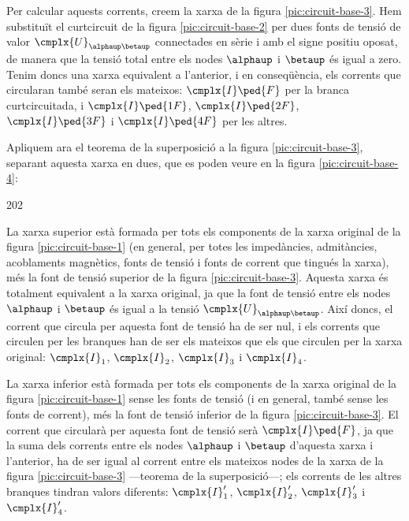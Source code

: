 \begin{center}
	
	\label{pic:circuit-base-2}
\end{center}


Per  calcular aquests corrents, creem  la xarxa de la figura  \vref{pic:circuit-base-3}. Hem substituït el curtcircuit de la  figura \vref{pic:circuit-base-2} per dues fonts de tensió de valor $\cmplx{U}_{\alphaup\betaup}$ connectades en sèrie i amb el signe positiu oposat, de manera que la tensió total entre els nodes $\alphaup$ i $\betaup$ és igual a zero. Tenim doncs una xarxa equivalent a l'anterior, i en conseqüència, els corrents que circularan també seran els mateixos: $\cmplx{I}\ped{F}$ per la branca curtcircuitada, i  $\cmplx{I}\ped{1F}$, $\cmplx{I}\ped{2F}$, $\cmplx{I}\ped{3F}$ i $\cmplx{I}\ped{4F}$ per les altres.

\begin{center}
	
	\label{pic:circuit-base-3}
\end{center}

Apliquem ara el teorema de la superposició a la figura \vref{pic:circuit-base-3}, separant aquesta xarxa en dues, que es poden veure en la figura \vref{pic:circuit-base-4}:
\begin{dingautolist}{202}
	\item La xarxa superior està formada per tots els  components de la xarxa original de la figura \vref{pic:circuit-base-1} (en general, per totes les impedàncies, admitàncies, acoblaments magnètics, fonts de tensió i fonts de corrent que tingués la xarxa), més la font de tensió superior de la figura \vref{pic:circuit-base-3}. Aquesta xarxa és totalment equivalent a la xarxa original, ja que la font de tensió entre els nodes $\alphaup$ i $\betaup$ és igual  a  la tensió $\cmplx{U}_{\alphaup\betaup}$. Així doncs, el corrent que circula per aquesta font de tensió ha de ser nul, i els corrents que circulen per les branques han de ser els mateixos que els que circulen per la xarxa original: $\cmplx{I}_1$, $\cmplx{I}_2$, $\cmplx{I}_3$ i $\cmplx{I}_4$.
	
	\item  La xarxa inferior està formada per tots els  components de la xarxa original de la figura \vref{pic:circuit-base-1} sense les fonts de tensió (i en general, també sense les fonts de corrent),  més la font de tensió inferior de la figura \vref{pic:circuit-base-3}. El corrent que circularà per aquesta font de tensió serà $\cmplx{I}\ped{F}$, ja que la suma dels corrents entre els nodes $\alphaup$ i $\betaup$ d'aquesta xarxa i l'anterior, ha de ser igual al corrent entre els mateixos nodes  de la xarxa de la  figura \vref{pic:circuit-base-3} ---teorema de la superposició---; els corrents de les altres branques tindran valors diferents: $\cmplx{I}_1'$, $\cmplx{I}_2'$, $\cmplx{I}_3'$ i $\cmplx{I}_4'$.
\end{dingautolist}

